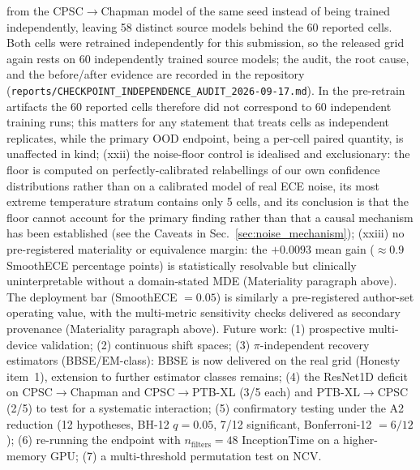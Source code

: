 \documentclass[final,5p,times,nonatbib]{elsarticle}
\begin{document}
from the CPSC$\rightarrow$Chapman model of the same seed instead of being
trained independently, leaving 58 distinct source models behind the 60
reported cells. Both cells were retrained independently for this
submission, so the released grid again rests on 60 independently trained
source models; the audit, the root cause, and the before/after evidence
are recorded in the repository
(\texttt{reports/CHECKPOINT\_INDEPENDENCE\_AUDIT\_2026-09-17.md}). In the
pre-retrain artifacts the 60 reported cells therefore did not correspond
to 60 independent training runs; this matters for any statement that
treats cells as independent replicates, while the primary OOD endpoint,
being a per-cell paired quantity, is unaffected in kind; (xxii) the
noise-floor control is idealised and exclusionary: the floor is computed
on perfectly-calibrated relabellings of our own confidence
distributions rather than on a calibrated model of real ECE noise, its
most extreme temperature stratum contains only 5 cells, and its
conclusion is that the floor cannot account for the primary finding
rather than that a causal mechanism has been established (see the
Caveats in Sec.~\ref{sec:noise_mechanism}); (xxiii) no pre-registered
materiality or equivalence margin: the $+0.0093$ mean gain
($\approx0.9$ SmoothECE percentage points) is statistically resolvable
but clinically uninterpretable without a domain-stated MDE (Materiality
paragraph above).
The deployment bar (SmoothECE
$=0.05$) is similarly a pre-registered author-set operating
value, with the multi-metric sensitivity checks delivered as
secondary provenance (Materiality paragraph above).
Future work:
(1) prospective multi-device validation; (2) continuous shift spaces;
(3) $\pi$-independent recovery estimators (BBSE/EM-class): BBSE is now
delivered on the real grid (Honesty item~1), extension to further
estimator classes remains; (4) the ResNet1D deficit on
CPSC$\rightarrow$Chapman and CPSC$\rightarrow$PTB-XL (3/5 each) and
PTB-XL$\rightarrow$CPSC (2/5) to test
for a systematic interaction; (5) confirmatory testing under the A2
reduction (12 hypotheses, BH-12 $q=0.05$, 7/12 significant,
Bonferroni-12 $=6/12$); (6) re-running the endpoint with
$n_{\text{filters}}=48$ InceptionTime on a higher-memory GPU; (7) a
multi-threshold permutation test on NCV.

\end{document}
